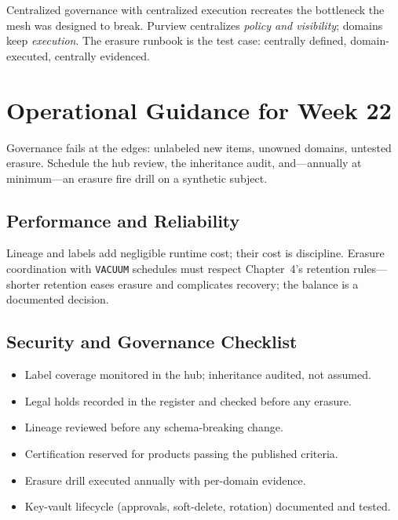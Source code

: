 \begin{pitfall}
Centralized governance with centralized execution recreates the bottleneck the mesh was designed to break. Purview centralizes \emph{policy and visibility}; domains keep \emph{execution}. The erasure runbook is the test case: centrally defined, domain-executed, centrally evidenced.
\end{pitfall}

\section{Operational Guidance for Week 22}
Governance fails at the edges: unlabeled new items, unowned domains, untested erasure. Schedule the hub review, the inheritance audit, and---annually at minimum---an erasure fire drill on a synthetic subject.

\subsection{Performance and Reliability}
Lineage and labels add negligible runtime cost; their cost is discipline. Erasure coordination with \texttt{VACUUM} schedules must respect Chapter~4's retention rules---shorter retention eases erasure and complicates recovery; the balance is a documented decision.

\subsection{Security and Governance Checklist}
\begin{itemize}
    \item Label coverage monitored in the hub; inheritance audited, not assumed.
    \item Legal holds recorded in the register and checked before any erasure.
    \item Lineage reviewed before any schema-breaking change.
    \item Certification reserved for products passing the published criteria.
    \item Erasure drill executed annually with per-domain evidence.
    \item Key-vault lifecycle (approvals, soft-delete, rotation) documented and tested.
\end{itemize}

